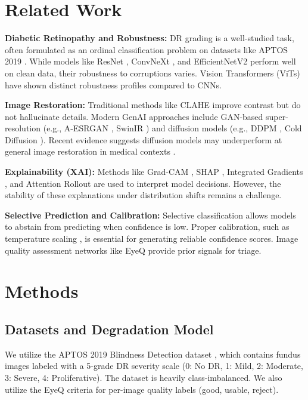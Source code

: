 \documentclass[runningheads]{llncs}
\begin{document}
\section{Related Work}
\textbf{Diabetic Retinopathy and Robustness:} DR grading is a well-studied task, often formulated as an ordinal classification problem on datasets like APTOS 2019 \cite{aptos2019}. While models like ResNet \cite{he2016resnet}, ConvNeXt \cite{liu2022convnext}, and EfficientNetV2 \cite{tan2021efficientnetv2} perform well on clean data, their robustness to corruptions varies. Vision Transformers (ViTs) \cite{dosovitskiy2021vit, radford2021clip} have shown distinct robustness profiles compared to CNNs.

\textbf{Image Restoration:} Traditional methods like CLAHE \cite{pizer1987clahe} improve contrast but do not hallucinate details. Modern GenAI approaches include GAN-based super-resolution (e.g., A-ESRGAN \cite{wei2021aesrgan}, SwinIR \cite{liang2021swinir}) and diffusion models (e.g., DDPM \cite{ho2020ddpm}, Cold Diffusion \cite{bansal2022colddiffusion}). Recent evidence suggests diffusion models may underperform at general image restoration in medical contexts \cite{arxiv241209324}.

\textbf{Explainability (XAI):} Methods like Grad-CAM \cite{selvaraju2017gradcam}, SHAP \cite{lundberg2017shap}, Integrated Gradients \cite{sundararajan2017ig}, and Attention Rollout \cite{abnar2020rollout} are used to interpret model decisions. However, the stability of these explanations under distribution shifts remains a challenge.

\textbf{Selective Prediction and Calibration:} Selective classification \cite{geifman2017selective} allows models to abstain from predicting when confidence is low. Proper calibration, such as temperature scaling \cite{guo2017calibration}, is essential for generating reliable confidence scores. Image quality assessment networks like EyeQ \cite{fu2019eyeq} provide prior signals for triage.

\section{Methods}

\subsection{Datasets and Degradation Model}
We utilize the APTOS 2019 Blindness Detection dataset \cite{aptos2019}, which contains fundus images labeled with a 5-grade DR severity scale (0: No DR, 1: Mild, 2: Moderate, 3: Severe, 4: Proliferative). The dataset is heavily class-imbalanced. We also utilize the EyeQ \cite{fu2019eyeq} criteria for per-image quality labels (good, usable, reject).
\end{document}
